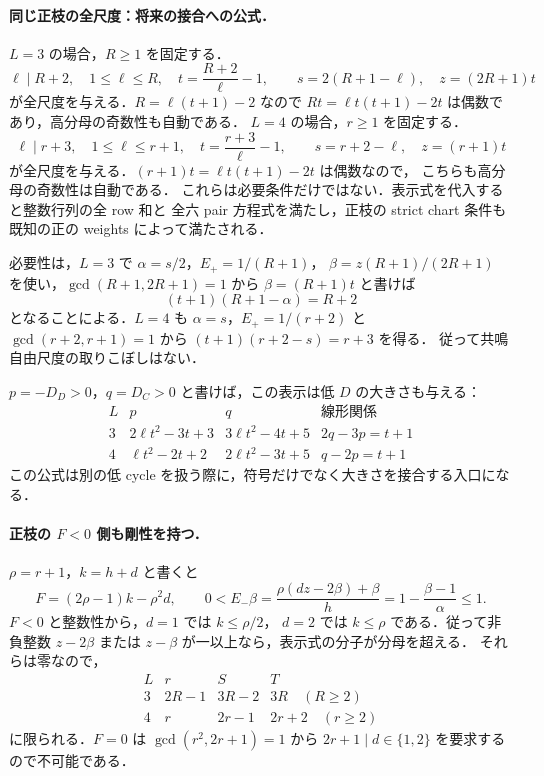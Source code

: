 \paragraph{同じ正枝の全尺度：将来の接合への公式．}
$L=3$ の場合，$R\ge1$ を固定する．
\[
 \ell\mid R+2,\quad1\le\ell\le R,\quad
 t=\frac{R+2}{\ell}-1,\qquad
 s=2(R+1-\ell),\quad z=(2R+1)t
\]
が全尺度を与える．$R=\ell(t+1)-2$ なので
$Rt=\ell t(t+1)-2t$ は偶数であり，高分母の奇数性も自動である．
$L=4$ の場合，$r\ge1$ を固定する．
\[
 \ell\mid r+3,\quad1\le\ell\le r+1,\quad
 t=\frac{r+3}{\ell}-1,\qquad
 s=r+2-\ell,\quad z=(r+1)t
\]
が全尺度を与える．$(r+1)t=\ell t(t+1)-2t$ は偶数なので，
こちらも高分母の奇数性は自動である．
これらは必要条件だけではない．表示式を代入すると整数行列の全 row 和と
全六 pair 方程式を満たし，正枝の strict chart 条件も既知の正の weights によって満たされる．

必要性は，$L=3$ で $\alpha=s/2$，$E_+=1/(R+1)$，
$\beta=z(R+1)/(2R+1)$ を使い，$\gcd(R+1,2R+1)=1$ から
$\beta=(R+1)t$ と書けば
\[
 (t+1)(R+1-\alpha)=R+2
\]
となることによる．$L=4$ も $\alpha=s$，$E_+=1/(r+2)$ と
$\gcd(r+2,r+1)=1$ から
$(t+1)(r+2-s)=r+3$ を得る．
従って共鳴自由尺度の取りこぼしはない．

$p=-D_D>0$，$q=D_C>0$ と書けば，この表示は低 $D$ の大きさも与える：
\[
 \begin{array}{c|c|c|c}
 L&p&q&\text{線形関係}\\\hline
 3&2\ell t^2-3t+3&3\ell t^2-4t+5&2q-3p=t+1\\
 4&\ell t^2-2t+2&2\ell t^2-3t+5&q-2p=t+1
 \end{array}
\]
この公式は別の低 cycle を扱う際に，符号だけでなく大きさを接合する入口になる．

\paragraph{正枝の $F<0$ 側も剛性を持つ．}
$\rho=r+1$，$k=h+d$ と書くと
\[
 F=(2\rho-1)k-\rho^2d,\qquad
 0<E_-\beta=\frac{\rho(dz-2\beta)+\beta}{h}
 =1-\frac{\beta-1}{\alpha}\le1.
\]
$F<0$ と整数性から，$d=1$ では $k\le\rho/2$，
$d=2$ では $k\le\rho$ である．従って非負整数
$z-2\beta$ または $z-\beta$ が一以上なら，表示式の分子が分母を超える．
それらは零なので，
\[
 \begin{array}{c|ccc}
 L&r&S&T\\\hline
 3&2R-1&3R-2&3R\quad(R\ge2)\\
 4&r&2r-1&2r+2\quad(r\ge2)
 \end{array}
\]
に限られる．$F=0$ は $\gcd(r^2,2r+1)=1$ から
$2r+1\mid d\in\{1,2\}$ を要求するので不可能である．

